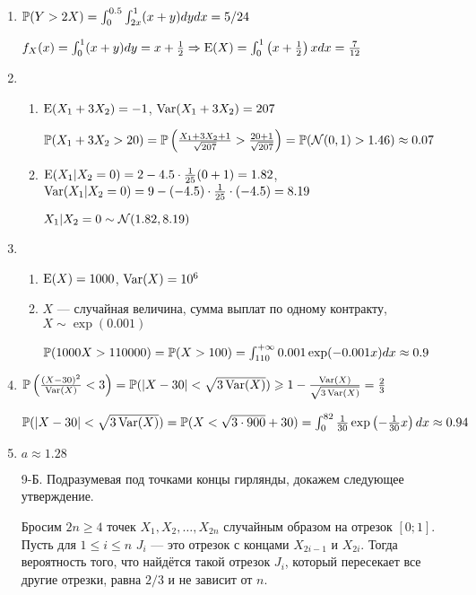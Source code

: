 \begin{enumerate}
\item
$\P(Y>2X)=\int_0^{0.5} \int_{2x}^{1} (x+y) dydx = 5/24$

$f_X(x) = \int_0^1 (x+y) dy = x + \frac{1}{2} \Rightarrow \E(X) = \int_0^1 \left(x+\frac{1}{2}\right)x dx = \frac{7}{12}$
\item
\begin{enumerate}
\item $\E(X_1 + 3X_2) = -1$, $\Var(X_1 + 3X_2) = 207$

$\P(X_1 + 3X_2 > 20) = \P\left(\frac{X_1 + 3X_2 +1}{\sqrt{207}} > \frac{20+1}{\sqrt{207}} \right) = \P(\cN(0,1)>1.46) \approx 0.07$
\item $\E(X_1|X_2 = 0) = 2 - 4.5\cdot\frac{1}{25}(0+1) = 1.82$, $\Var(X_1 | X_2 = 0) = 9 - (-4.5) \cdot \frac{1}{25} \cdot(-4.5) = 8.19$

$X_1 | X_2 = 0 \sim \cN(1.82, 8.19)$
\end{enumerate}
\item
\begin{enumerate}
\item $\E(X)=1000$, $\Var(X) = 10^6$
\item $X$ — случайная величина, сумма выплат по одному контракту, $X \sim \exp(0.001)$

$\P(1000X>110000) = \P(X>100) = \int_{110}^{+\infty} 0.001 \exp(-0.001x) dx \approx 0.9$
\end{enumerate}
\item $\P\left(\frac{(X-30)^{2}}{\Var(X)}<3\right) = \P(|X-30|< \sqrt{3\Var(X)}) \geq 1 - \frac{\Var(X)}{ \sqrt{3\Var(X)}} = \frac{2}{3}$

$\P(|X-30|< \sqrt{3\Var(X)}) = \P(X< \sqrt{3\cdot900}+30) = \int_{0}^{82}\frac{1}{30} \exp\left(-\frac{1}{30}x\right)dx\approx 0.94$
\item $a \approx 1.28$
\item[9-Б.]
Подразумевая под точками концы гирлянды, докажем следующее утверждение.

Бросим $2n \geq 4$ точек $X_1, X_2, \ldots, X_{2n}$ случайным образом на отрезок $[0;1]$. Пусть для $1 \leq i \leq n$ $J_i$ — это отрезок с концами $X_{2i-1}$ и $X_{2i}$.
Тогда вероятность того, что найдётся такой отрезок $J_i$, который пересекает все другие отрезки, равна $2/3$ и не зависит от $n$.


\end{enumerate}
